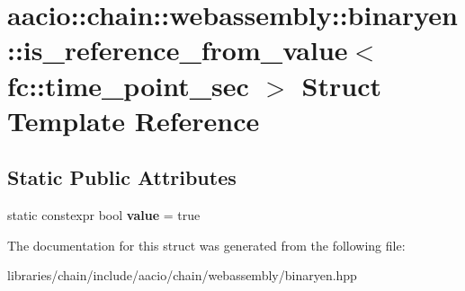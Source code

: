 \hypertarget{structaacio_1_1chain_1_1webassembly_1_1binaryen_1_1is__reference__from__value_3_01fc_1_1time__point__sec_01_4}{}\section{aacio\+:\+:chain\+:\+:webassembly\+:\+:binaryen\+:\+:is\+\_\+reference\+\_\+from\+\_\+value$<$ fc\+:\+:time\+\_\+point\+\_\+sec $>$ Struct Template Reference}
\label{structaacio_1_1chain_1_1webassembly_1_1binaryen_1_1is__reference__from__value_3_01fc_1_1time__point__sec_01_4}
\subsection*{Static Public Attributes}
\begin{DoxyCompactItemize}
\item 
\mbox{\label{structaacio_1_1chain_1_1webassembly_1_1binaryen_1_1is__reference__from__value_3_01fc_1_1time__point__sec_01_4_abff6cf3ec0ec1972428c72a4639f8289}} 
static constexpr bool {\bfseries value} = true
\end{DoxyCompactItemize}


The documentation for this struct was generated from the following file\+:\begin{DoxyCompactItemize}
\item 
libraries/chain/include/aacio/chain/webassembly/binaryen.\+hpp\end{DoxyCompactItemize}
